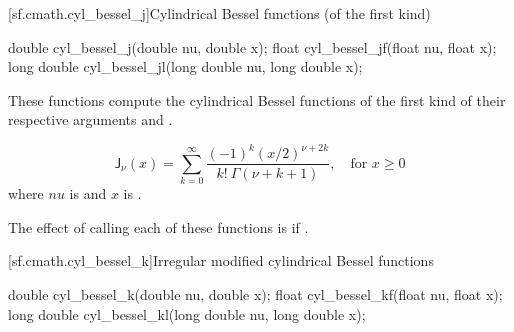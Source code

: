 [sf.cmath.cyl_bessel_j]{Cylindrical Bessel functions (of the first kind)}%
%
%
%
%
%
\begin{itemdecl}
double       cyl_bessel_j(double nu, double x);
float        cyl_bessel_jf(float nu, float x);
long double  cyl_bessel_jl(long double nu, long double x);
\end{itemdecl}

\begin{itemdescr}

\pnum\effects
These functions compute
the cylindrical Bessel functions of the first kind
of their respective arguments
 and .

\pnum\returns
\[%
  \mathsf{J}_\nu(x) =
  \sum_{k=0}^\infty \frac{(-1)^k (x/2)^{\nu+2k}}
			 {k! \: \Gamma(\nu+k+1)},
	   \quad \mbox{for $x \ge 0$}
\]
where
$nu$ is  and
$x$ is .

\pnum\remark
The effect of calling each of these functions
is 
if .
\end{itemdescr}

[sf.cmath.cyl_bessel_k]{Irregular modified cylindrical Bessel functions}%
%
%
%
%
%
\begin{itemdecl}
double       cyl_bessel_k(double nu, double x);
float        cyl_bessel_kf(float nu, float x);
long double  cyl_bessel_kl(long double nu, long double x);
\end{itemdecl}

